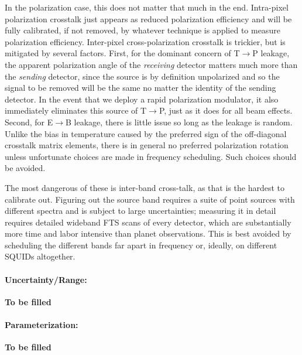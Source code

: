 In the polarization case, this does not matter that much in the end.
Intra-pixel polarization crosstalk just appears as reduced polarization efficiency and will be fully calibrated, if not removed, by whatever technique is applied to measure polarization efficiency.
Inter-pixel cross-polarization crosstalk is trickier, but is mitigated by several factors.
First, for the dominant concern of T$\rightarrow$P leakage, the apparent polarization angle of the \emph{receiving} detector matters much more than the \emph{sending} detector, since the source is by definition unpolarized and so the signal to be removed will be the same no matter the identity of the sending detector.
In the event that we deploy a rapid polarization modulator, it also immediately eliminates this source of T$\rightarrow$P, just as it does for all beam effects.
Second, for E$\rightarrow$B leakage, there is little issue so long as the leakage is random.
Unlike the bias in temperature caused by the preferred sign of the off-diagonal crosstalk matrix elements, there is in general no preferred polarization rotation unless unfortunate choices are made in frequency scheduling.
Such choices should be avoided.

The most dangerous of these is inter-band cross-talk, as that is the hardest to calibrate out.
Figuring out the source band requires a suite of point sources with different spectra and is subject to large uncertainties; measuring it in detail requires detailed wideband FTS scans of every detector, which are substantially more time and labor intensive than planet observations.
This is best avoided by scheduling the different bands far apart in frequency or, ideally, on different SQUIDs altogether.

\paragraph{Uncertainty/Range:}
\textbf{To be filled}
\paragraph{Parameterization:}
\textbf{To be filled}

